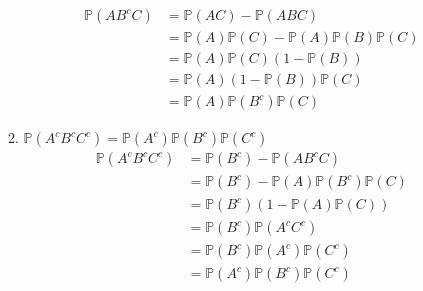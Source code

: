 \documentclass[12pt, letterpaper]{article}
\newcommand{\Pro}{\mathbb{P}}
\begin{document}
\begin{enumerate}
\begin{enumerate}
		\begin{align*}
			\Pro(AB^cC) &= \Pro(AC) - \Pro(ABC)\\
				&= \Pro(A)\Pro(C) - \Pro(A)\Pro(B)\Pro(C)\\
				&= \Pro(A)\Pro(C)(1-\Pro(B))\\
				&= \Pro(A)(1-\Pro(B))\Pro(C)\\
				&= \Pro(A)\Pro(B^c)\Pro(C)
		\end{align*}
		\item $\Pro(A^cB^cC^c) = \Pro(A^c)\Pro(B^c)\Pro(C^c)$\\
		\begin{align*}
			\Pro(A^cB^cC^c) &= \Pro(B^c) - \Pro(AB^cC)\\
			&= \Pro(B^c) - \Pro(A)\Pro(B^c)\Pro(C)\\
			&= \Pro(B^c)(1 - \Pro(A)\Pro(C))\\
			&= \Pro(B^c)\Pro(A^cC^c)\\
			&= \Pro(B^c)\Pro(A^c)\Pro(C^c)\\
			&= \Pro(A^c)\Pro(B^c)\Pro(C^c)
		\end{align*}
	\end{enumerate}
\end{enumerate}
\end{document}
